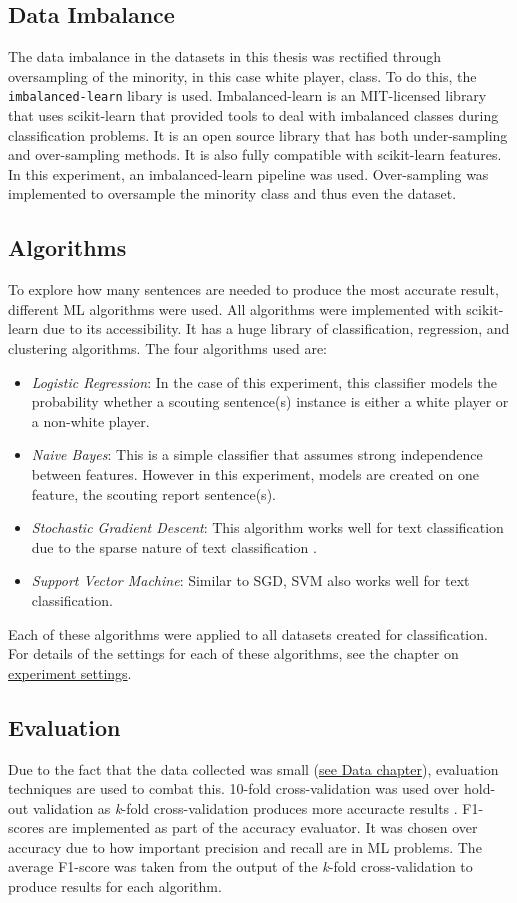 \documentclass[oneside,12pt]{Classes/RoboticsLaTeX}
\begin{document}
\subsection{Data Imbalance}
The data imbalance in the datasets in this thesis was rectified through oversampling of the minority, in this case white player, class. To do this, the \texttt{imbalanced-learn} libary \citep{imb-learn} is used.
Imbalanced-learn is an MIT-licensed library that uses scikit-learn that provided tools to deal with imbalanced classes during classification problems. It is an open source library that has
both under-sampling and over-sampling methods. It is also fully compatible with scikit-learn features. In this experiment, an imbalanced-learn pipeline was used. Over-sampling was implemented to oversample
the minority class and thus even the dataset.

\subsection{Algorithms}
To explore how many sentences are needed to produce the most accurate result, different ML algorithms were used. All algorithms were implemented with scikit-learn \citep{scikit-learn} 
due to its accessibility. It has a huge library of classification, regression, and clustering algorithms. The four algorithms used are:
\begin{itemize}
  \item {\it Logistic Regression}: In the case of this experiment, this classifier models the probability whether a scouting sentence(s) instance is either a white player or a non-white player.
  \item {\it Naive Bayes}: This is a simple classifier that assumes strong independence between features. However in this experiment, models are created on one feature, the scouting report sentence(s).
  \item {\it Stochastic Gradient Descent}: This algorithm works well for text classification due to the sparse nature of text classification \citep{SVM_SGD}.
  \item {\it Support Vector Machine}: Similar to SGD, SVM also works well for text classification.
\end{itemize}
Each of these algorithms were applied to all datasets created for classification. For details of the settings for each of these algorithms, see the chapter on \hyperref[chap:experiments]{experiment settings}.

\subsection{Evaluation}
Due to the fact that the data collected was small (\hyperref[chap:data]{see Data chapter}), evaluation techniques are used to combat this. 10-fold cross-validation was used over hold-out validation
as {\it k}-fold cross-validation produces more accuracte results \citep{k-fold_cross}. F1-scores are implemented as part of the accuracy evaluator. It was chosen over accuracy due to how important
precision and recall are in ML problems. The average F1-score was taken from the output of the {\it k}-fold cross-validation to produce results for each algorithm.
\end{document}
